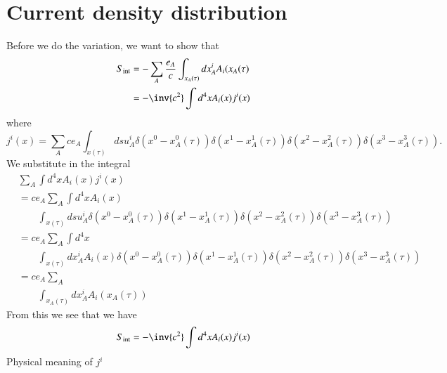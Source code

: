 \section{Current density distribution}

Before we do the variation, we want to show that
%
\begin{equation}\label{eqn:relativisticElectrodynamicsL12b:590}
\begin{aligned}
S_{\text{int}}
&= -\sum_A \frac{e_A}{c} \int_{x_A(\tau)} dx^i_A A_i(x_A(\tau) \\
&= -\inv{c^2} \int d^4 x A_i(x) j^i(x)
\end{aligned}
\end{equation}
%
where
%
\begin{equation}\label{eqn:relativisticElectrodynamicsL12b:390}
j^i(x) =
\sum_A c e_A \int_{x(\tau)}
ds u^i_A
\delta(x^0 - x^0_A(\tau))
\delta(x^1 - x^1_A(\tau))
\delta(x^2 - x^2_A(\tau))
\delta(x^3 - x^3_A(\tau)).
\end{equation}
%
We substitute in the integral
%
\begin{equation}\label{eqn:relativisticElectrodynamicsL12b:610}
\begin{aligned}
&\sum_A \int d^4 x A_i(x) j^i(x) \\
&=
c e_A \sum_A \int d^4 x A_i(x) \\
&\qquad \int_{x(\tau)}
ds u^i_A
\delta(x^0 - x^0_A(\tau))
\delta(x^1 - x^1_A(\tau))
\delta(x^2 - x^2_A(\tau))
\delta(x^3 - x^3_A(\tau)) \\
&=
c e_A \sum_A
\int d^4 x \\
&\qquad \int_{x(\tau)}
dx^i_A
A_i(x)
\delta(x^0 - x^0_A(\tau))
\delta(x^1 - x^1_A(\tau))
\delta(x^2 - x^2_A(\tau))
\delta(x^3 - x^3_A(\tau)) \\
&=
c e_A \sum_A \\
&\qquad \int_{x_A(\tau)}
dx^i_A
A_i(x_A(\tau))
\end{aligned}
\end{equation}
%
From this we see that we have
%
\begin{equation}\label{eqn:relativisticElectrodynamicsL12b:430}
S_{\text{int}} = -\inv{c^2} \int d^4 x A_i(x) j^i(x)
\end{equation}
%
Physical meaning of \(j^i\)

